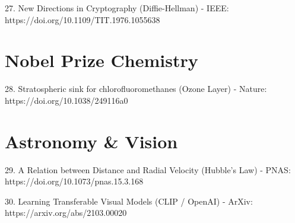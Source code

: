 \documentclass[12pt]{article}
\begin{document}
27. New Directions in Cryptography (Diffie-Hellman) - IEEE:
https://doi.org/10.1109/TIT.1976.1055638

\section{Nobel Prize Chemistry}
28. Stratospheric sink for chlorofluoromethanes (Ozone Layer) - Nature:
https://doi.org/10.1038/249116a0

\section{Astronomy \& Vision}
29. A Relation between Distance and Radial Velocity (Hubble's Law) - PNAS:
https://doi.org/10.1073/pnas.15.3.168

30. Learning Transferable Visual Models (CLIP / OpenAI) - ArXiv:
https://arxiv.org/abs/2103.00020
\end{document}
